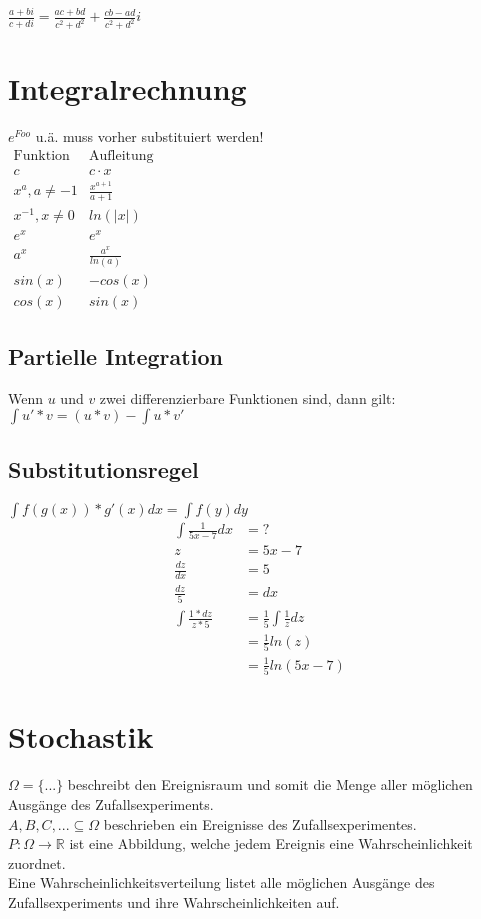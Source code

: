 \documentclass[a4paper, 11pt]{article}
\begin{document}
\begin{multicols}{3}
\begin{small}
        $\displaystyle \frac{a + bi}{c + di} = \frac{ac + bd}{c^2 + d^2} + \frac{cb - ad}{c^2 + d^2}i$
    
         
    \section{Integralrechnung}
        $e^{Foo}$ u.ä. muss vorher substituiert werden!\\
        
        $
        \begin{matrix}
        \text{Funktion} & \text{Aufleitung} \\
        c & c \cdot x \\
        x^a, a \neq -1 & \frac{x^{a+1}}{a+1}\\
        x^{-1}, x \neq 0 & ln(|x|)\\
        e^x & e^x \\
        a^x & \frac{a^x}{ln(a)} \\
        sin(x) & -cos(x)\\
        cos(x) & sin(x)
        \end{matrix}
        $
        \subsection{Partielle Integration}
        Wenn $u$ und $v$ zwei differenzierbare Funktionen sind, dann gilt: \\
        $\int u' * v = (u * v) - \int u * v'$
        \subsection{Substitutionsregel}
        $\int f(g(x)) * g'(x) dx = \int f(y) dy$
        \begin{align*}
            \int \frac{1}{5x - 7} dx &= ?\\
            z &= 5x - 7 \\
            \frac{dz}{dx} &= 5 \\   
            \frac{dz}{5} &= dx  \\
            \int \frac{1 * dz}{z * 5} &= \frac{1}{5} \int \frac{1}{z} dz \\
                                      &= \frac{1}{5} ln(z) \\
                                      &= \frac{1}{5} ln(5x-7)
        \end{align*}
    \section{Stochastik}
    	$\Omega = \{ ... \}$ beschreibt den Ereignisraum und somit die Menge aller möglichen Ausgänge des Zufallsexperiments.\\
    	$A, B, C, ... \subseteq \Omega$ beschrieben ein Ereignisse des Zufallsexperimentes.\\
    	$P: \Omega \rightarrow \mathbb{R}$ ist eine Abbildung, welche jedem Ereignis eine Wahrscheinlichkeit zuordnet.\\
    	Eine Wahrscheinlichkeitsverteilung listet alle möglichen Ausgänge des Zufallsexperiments und ihre Wahrscheinlichkeiten auf.

\end{small}
\end{multicols}
\end{document}
